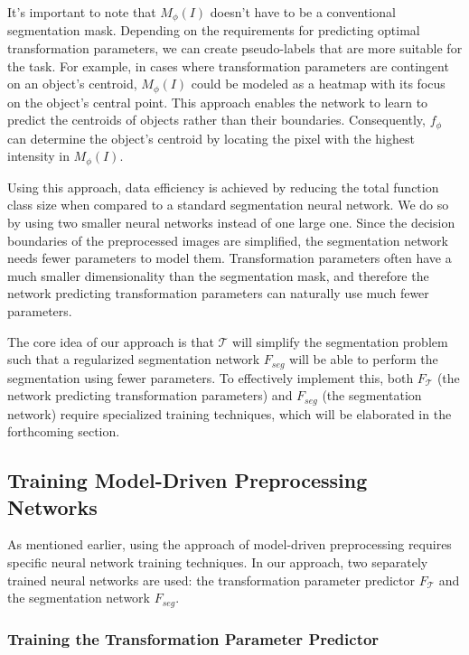 It's important to note that \( M_\phi(I) \) doesn't have to be a conventional segmentation mask. Depending on the requirements for predicting optimal transformation parameters, we can create pseudo-labels that are more suitable for the task. For example,
 in cases where transformation parameters are contingent on an object's centroid, \( M_\phi(I) \) could be modeled as a heatmap with its focus on the object's central point. This approach enables the network to learn to predict the centroids of objects rather than their boundaries. Consequently, \( f_\phi \) can determine the object's centroid by locating the pixel with the highest intensity in \( M_\phi(I) \).

Using this approach, data efficiency is achieved by reducing the total function class size when compared to a standard segmentation neural network. We do so by using two smaller neural networks instead of one large one. Since the decision boundaries of the preprocessed images are simplified, the segmentation network needs fewer parameters to model them. Transformation parameters often have a much smaller dimensionality than the segmentation mask, and therefore the network predicting transformation parameters can naturally use much fewer parameters.

The core idea of our approach is that $\mathcal{T}$ will simplify the segmentation problem such that a regularized segmentation network $F_{seg}$ will be able to perform the segmentation using fewer parameters. To effectively implement this, both \(F_{\mathcal{T}}\) (the network predicting transformation parameters) and \(F_{seg}\) (the segmentation network) require specialized training techniques, which will be elaborated in the forthcoming section.

\subsection{Training Model-Driven Preprocessing Networks}

As mentioned earlier, using the approach of model-driven preprocessing requires specific neural network training techniques. In our approach, two separately trained neural networks are used: the transformation parameter predictor $F_{\mathcal{T}}$ and the segmentation network $F_{seg}$. 

\subsubsection{Training the Transformation Parameter Predictor}

